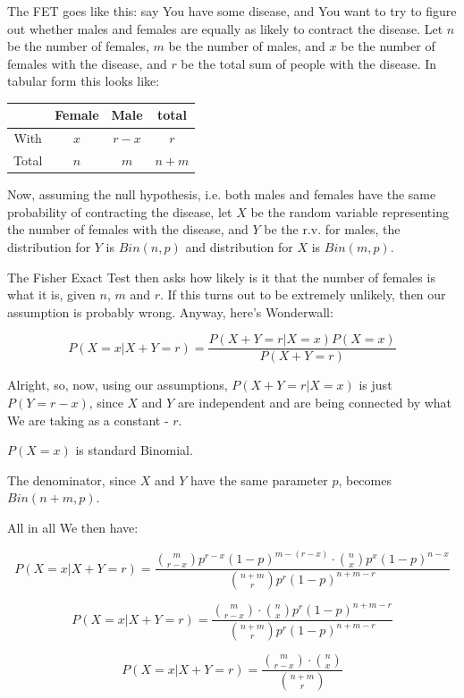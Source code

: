 \documentclass{article}
\begin{document}
		The FET goes like this: say You have some disease, and You want to try to figure out whether males and females are equally as likely to contract the disease. Let $n$ be the number of females, $m$ be the number of males, and $x$ be the number of females with the disease, and $r$ be the total sum of people with the disease. In tabular form this looks like:
		
				
		\begin{center}
			\begin{tabu}{|c | c | c | c |}
				\hline 
				  & Female & Male & total\\
				\hline
				With & $x$ & $r-x$ & $r$ \\
				\hline
				Total & $n$ & $m$  & $n+m$\\
				\hline	
			\end{tabu}
		\end{center}
		
		Now, assuming the null hypothesis, i.e. both males and females have the same probability of contracting the disease, let $X$ be the random variable representing the number of females with the disease, and $Y$ be the r.v. for males, the distribution for $Y$ is $Bin(n, p)$ and distribution for $X$ is $Bin(m, p)$.
		
		The Fisher Exact Test then asks how likely is it that the number of females is what it is, given $n$, $m$ and $r$. If this turns out to be extremely unlikely, then our assumption is probably wrong. Anyway, here's Wonderwall:
		
		$$P(X = x \vert X + Y = r) = \frac{P(X + Y = r \vert X = x) P(X = x)}{P(X+Y = r)}$$
		
		Alright, so, now, using our assumptions, $P(X + Y = r \vert X = x)$ is just $P(Y = r - x)$, since $X$ and $Y$ are independent and are being connected by what We are taking as a constant - $r$. 
		
		$P(X = x)$ is standard Binomial. 
		
		The denominator, since $X$ and $Y$ have the same parameter $p$, becomes $Bin(n+m, p)$.

		All in all We then have:
		
		$$P(X = x \vert X + Y = r) = \frac{{m \choose r-x}p^{r-x}(1-p)^{m-(r-x)}\cdot {n \choose x}p^x(1-p)^{n-x}}{{n+m \choose r}p^r(1-p)^{n+m-r}}$$
		
		$$P(X = x \vert X + Y = r) = \frac{{m \choose r-x}\cdot {n \choose x}p^r(1-p)^{n+m-r}}{{n+m \choose r}p^r(1-p)^{n+m-r}}$$
		
		$$P(X = x \vert X + Y = r) = \frac{{m \choose r-x}\cdot {n \choose x}}{{n+m \choose r}}$$
		
\end{document}
